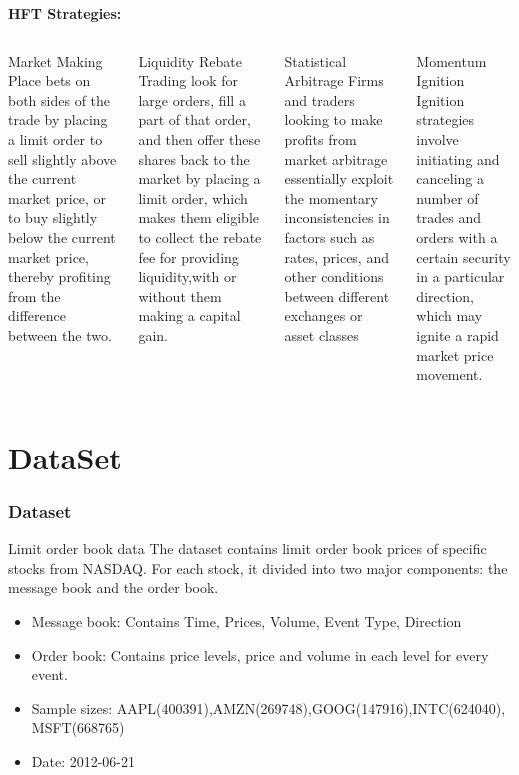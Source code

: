 \documentclass[xcolor={x11names,svgnames,dvipsnames}]{beamer}
\begin{document}
\begin{frame}

\textbf{\large{HFT Strategies:}}

\begin{columns}
\column{2.4in}
\begin{block}{Market Making}
\small{Place bets on both sides of the trade by placing a limit order to
sell slightly above the current market price, or to buy slightly below the current
market price, thereby profiting from the difference between the two. }
\end{block}
\begin{block}{Liquidity Rebate Trading
 }
\small{look for large orders, fill a
part of that order, and then offer these shares back to the market by placing a limit order, which makes them eligible to collect the rebate fee for providing liquidity,with or without them making a capital gain.}
\end{block}
\column{2.5in}
\begin{block}{\alert{Statistical Arbitrage}}
\small{Firms and traders looking to make profits from market arbitrage essentially exploit
 the momentary \alert{inconsistencies} in factors such as rates, prices, and other conditions
 between different exchanges or asset classes}
\end{block}
\begin{block}{Momentum Ignition }
\small{Ignition strategies involve initiating and canceling a number of trades and orders with a certain security in a particular direction, which may ignite a rapid market price movement.}
\end{block}
\end{columns}
\end{frame}

\section{DataSet}
\begin{frame}
\frametitle{Dataset}
\begin{block}{Limit order book data}
The dataset contains limit order book prices of specific stocks from NASDAQ. For each stock, it divided into two major components: the\alert{ message book} and the \alert{order book}.\\
\begin{itemize}
\item Message book: Contains Time, Prices, Volume, Event Type, Direction

\item Order book: Contains price levels, price and volume in each level for every event.  	

\item Sample sizes: AAPL(400391),AMZN(269748),GOOG(147916),INTC(624040),
MSFT(668765)
\item Date: 2012-06-21
\end{itemize}

\end{block} 

\end{frame}
\end{document}
